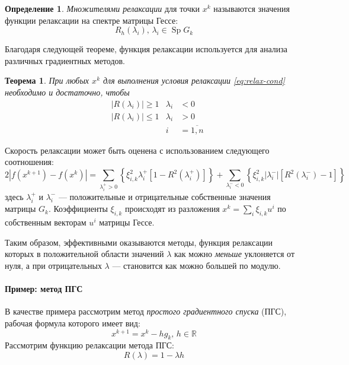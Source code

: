 \documentclass{article}
\renewcommand{\leq}{\leqslant}
\renewcommand{\geq}{\geqslant}
\newcommand{\neword}{\emph}
\newcommand{\abs}[1]{\left \lvert{#1}\right \rvert}
\newcommand{\set}[1]{\mathbb{#1}}
\DeclareMathOperator{\Sp}{Sp}
\newtheorem{thm}{Теорема}[section]
\theoremstyle{remark}
\theoremstyle{definition}
\newtheorem{dfn}{Определение}[section]
\numberwithin{equation}{section}
\begin{document}
\begin{dfn}
  \neword{Множителями релаксации} для точки $x^k$ называются значения
  функции релаксации на спектре матрицы Гессе:
  \begin{equation}
    \label{eq:relax-fac}
    R_h(\lambda_i),\, \lambda_i \in \Sp{G_k}
  \end{equation}
\end{dfn}

Благодаря следующей теореме, функция релаксации используется для
анализа различных градиентных методов.

\begin{thm}
  \label{thm:relax-thm}
  При любых $x^k$ для выполнения условия релаксации
  \eqref{eq:relax-cond} необходимо и достаточно, чтобы
  \begin{equation}
    \label{eq:relax-thm}
    \begin{aligned}
      & \abs{R(\lambda_i)} \geq 1 & \lambda_i& < 0 \\
      & \abs{R(\lambda_i)} \leq 1 & \lambda_i& > 0\\
      &&i& = \overline{1, n}
    \end{aligned}
  \end{equation}
\end{thm}



Скорость релаксации может быть оценена с использованием следующего
соотношения:
\begin{equation}
  \label{eq:relax-speed}
  2\abs{f(x^{k+1})-f(x^k)}=\sum_{\lambda_i^+>0} \left\{\xi_{i,k}^2
    \lambda_i^+ [1-R^2(\lambda_i^+)]\right\} + \sum_{\lambda_i^-<0} \left\{\xi_{i,k}^2
    \abs{\lambda_i^-} [R^2(\lambda_i^-)-1]\right\}
\end{equation}
здесь $\lambda_i^+$ и $\lambda_i^-$ — положительные и отрицательные
собственные значения матрицы $G_k$. Коэффициенты $\xi_{i,k}$
происходят из разложения $x^k=\sum_i{\xi_{i,k}u^i}$ по собственным
векторам $u^i$ матрицы Гессе.

Таким образом, эффективными оказываются методы, функция релаксации
которых в положительной области значений $\lambda$ как можно
\emph{меньше} уклоняется от нуля, а при отрицательных $\lambda$ —
становится как можно большей по модулю.

\paragraph{Пример: метод ПГС}

В качестве примера рассмотрим метод \neword{простого градиентного
  спуска} (ПГС), рабочая формула которого имеет вид:
\begin{equation*}
  x^{k+1}=x^k-hg_k,\, h\in\set{R}
\end{equation*}
Рассмотрим функцию релаксации метода ПГС:
\begin{equation}
  \label{eq:gd-relax}
  R(\lambda) = 1 - \lambda h
\end{equation}
\end{document}
